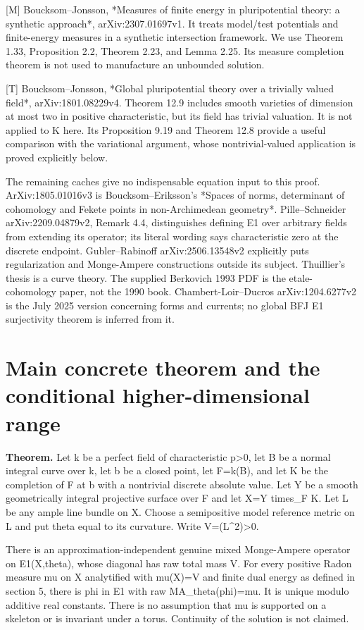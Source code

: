 \documentclass[11pt]{article}
\begin{document}
[M] Boucksom--Jonsson, *Measures of finite energy in pluripotential theory: a synthetic approach*, arXiv:2307.01697v1. It treats model/test potentials and finite-energy measures in a synthetic intersection framework. We use Theorem 1.33, Proposition 2.2, Theorem 2.23, and Lemma 2.25. Its measure completion theorem is not used to manufacture an unbounded solution.

[T] Boucksom--Jonsson, *Global pluripotential theory over a trivially valued field*, arXiv:1801.08229v4. Theorem 12.9 includes smooth varieties of dimension at most two in positive characteristic, but its field has trivial valuation. It is not applied to K here. Its Proposition 9.19 and Theorem 12.8 provide a useful comparison with the variational argument, whose nontrivial-valued application is proved explicitly below.

The remaining caches give no indispensable equation input to this proof. ArXiv:1805.01016v3 is Boucksom--Eriksson's *Spaces of norms, determinant of cohomology and Fekete points in non-Archimedean geometry*. Pille--Schneider arXiv:2209.04879v2, Remark 4.4, distinguishes defining E1 over arbitrary fields from extending its operator; its literal wording says characteristic zero at the discrete endpoint. Gubler--Rabinoff arXiv:2506.13548v2 explicitly puts regularization and Monge-Ampere constructions outside its subject. Thuillier's thesis is a curve theory. The supplied Berkovich 1993 PDF is the etale-cohomology paper, not the 1990 book. Chambert-Loir--Ducros arXiv:1204.6277v2 is the July 2025 version concerning forms and currents; no global BFJ E1 surjectivity theorem is inferred from it.

\section{Main concrete theorem and the conditional higher-dimensional range}

\textbf{Theorem.} Let k be a perfect field of characteristic p\textgreater{}0, let B be a normal integral curve over k, let b be a closed point, let F=k(B), and let K be the completion of F at b with a nontrivial discrete absolute value. Let Y be a smooth geometrically integral projective surface over F and let X=Y times\_F K. Let L be any ample line bundle on X. Choose a semipositive model reference metric on L and put theta equal to its curvature. Write V=(L\textasciicircum{}2)\textgreater{}0.

There is an approximation-independent genuine mixed Monge-Ampere operator on E1(X,theta), whose diagonal has raw total mass V. For every positive Radon measure mu on X analytified with mu(X)=V and finite dual energy as defined in section 5, there is phi in E1 with raw MA\_theta(phi)=mu. It is unique modulo additive real constants. There is no assumption that mu is supported on a skeleton or is invariant under a torus. Continuity of the solution is not claimed.
\end{document}

